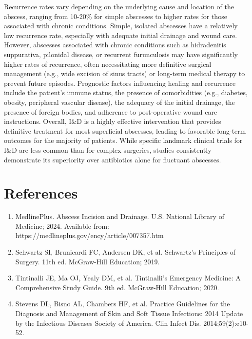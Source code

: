 Recurrence rates vary depending on the underlying cause and location of the abscess, ranging from 10-20\% for simple abscesses to higher rates for those associated with chronic conditions. Simple, isolated abscesses have a relatively low recurrence rate, especially with adequate initial drainage and wound care. However, abscesses associated with chronic conditions such as hidradenitis suppurativa, pilonidal disease, or recurrent furunculosis may have significantly higher rates of recurrence, often necessitating more definitive surgical management (e.g., wide excision of sinus tracts) or long-term medical therapy to prevent future episodes. Prognostic factors influencing healing and recurrence include the patient's immune status, the presence of comorbidities (e.g., diabetes, obesity, peripheral vascular disease), the adequacy of the initial drainage, the presence of foreign bodies, and adherence to post-operative wound care instructions. Overall, I\&D is a highly effective intervention that provides definitive treatment for most superficial abscesses, leading to favorable long-term outcomes for the majority of patients. While specific landmark clinical trials for I\&D are less common than for complex surgeries, studies consistently demonstrate its superiority over antibiotics alone for fluctuant abscesses.

\section*{References}
\begin{enumerate}
  \item MedlinePlus. Abscess Incision and Drainage. U.S. National Library of Medicine; 2024. Available from: https://medlineplus.gov/ency/article/007357.htm

  \item Schwartz SI, Brunicardi FC, Andersen DK, et al. Schwartz's Principles of Surgery. 11th ed. McGraw-Hill Education; 2019.

  \item Tintinalli JE, Ma OJ, Yealy DM, et al. Tintinalli's Emergency Medicine: A Comprehensive Study Guide. 9th ed. McGraw-Hill Education; 2020.

  \item Stevens DL, Bisno AL, Chambers HF, et al. Practice Guidelines for the Diagnosis and Management of Skin and Soft Tissue Infections: 2014 Update by the Infectious Diseases Society of America. Clin Infect Dis. 2014;59(2):e10-52.
\end{enumerate}

\clearpage
